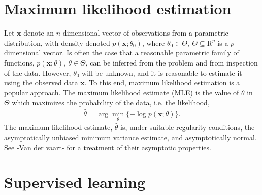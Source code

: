 
\section{Maximum likelihood estimation}

Let $\mathbf{x}$ denote an $n$-dimensional vector of observations from a parametric distribution, with density denoted $p(\mathbf{x};\theta_0)$, where $\theta_0\in \Theta,~\Theta\subseteq \mathrm{R}^p$ is a $p$-dimensional vector.
Is often the case that a reasonable parametric family of functions, $p(\mathbf{x};\theta),~\theta\in \Theta$, can be inferred from the problem and from inspection of the data.
However, $\theta_0$ will be unknown, and it is reasonable to estimate it using the observed data $\mathbf{x}$.
To this end, maximum likelihood estimation is a popular approach.
The maximum likelihood estimate (MLE) is the value of $\theta$ in $\Theta$ which maximizes the probability of the data, i.e. the likelihood, 
\begin{align}\label{eq:mle}
	\hat{\theta} = \arg\min_\theta \{-\log p(\mathbf{x};\theta)\}.
\end{align}
The maximum likelihood estimate, $\hat{\theta}$ is, under suitable regularity conditions, the asymptotically unbiased minimum variance estimate, and asymptotically normal.
See -Van der vaart- for a treatment of their asymptotic properties.


\section{Supervised learning}

